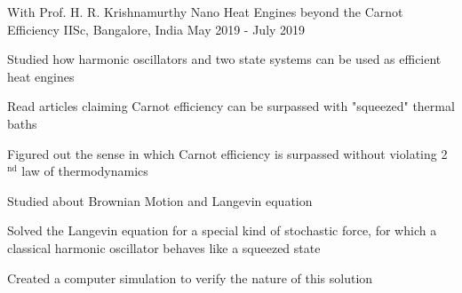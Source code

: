 \begin{cventries}
  \cventry
    {With Prof. H. R. Krishnamurthy} %
    {Nano Heat Engines beyond the Carnot Efficiency} %
    {IISc, Bangalore, India} %
    {May 2019 - July 2019} %
    {
      \begin{cvitems} %
        \item {Studied how harmonic oscillators and two state systems can be used as efficient heat engines}
        \item {Read articles claiming Carnot efficiency can be surpassed with "squeezed" thermal baths}
        \item {Figured out the sense in which Carnot efficiency is surpassed without violating 2$^{\text{nd}}$ law of thermodynamics}
        \item {Studied about Brownian Motion and Langevin equation}
        \item {Solved the Langevin equation for a special kind of stochastic force, for which a classical harmonic oscillator behaves like a squeezed state}
        \item {Created a computer simulation to verify the nature of this solution}
      \end{cvitems}
    }


\end{cventries}
